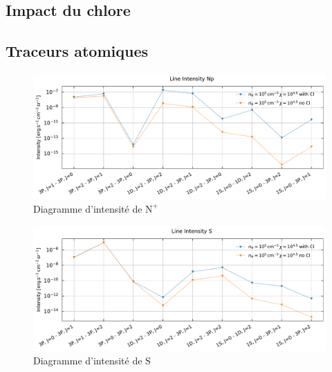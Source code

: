 \begin{appendices}




\section{Impact du chlore} 
\label{appendix:chlore}
\subsection*{Traceurs atomiques}
\begin{figure}[!h]
    \centering \includegraphics[trim = {0 0 0 1cm},clip,width=1\textwidth]{figure/Cl/gridModelEmiss/I_comp_Np.pdf}
        \caption{Diagramme d'intensité de $\mathrm{N}^+$}
        \label{fig:cl:emiss:Np}
\end{figure}

\begin{figure}[!h]
    \centering \includegraphics[trim = {0 0 0 1cm},clip,width=1\textwidth]{figure/Cl/gridModelEmiss/I_comp_S.pdf}
        \caption{Diagramme d'intensité de $\mathrm{S}$}
        \label{fig:cl:emiss:S}
\end{figure}


\end{appendices}
